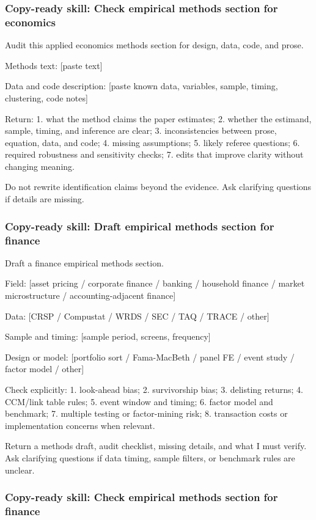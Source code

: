 \documentclass[11pt]{article}
\newcommand{\skill}[1]{\subsubsection*{Copy-ready skill: #1}}
\begin{document}
\skill{Check empirical methods section for economics}

\begin{promptblock}
Audit this applied economics methods section for design, data, code, and prose.

Methods text:
[paste text]

Data and code description:
[paste known data, variables, sample, timing, clustering, code notes]

Return:
1. what the method claims the paper estimates;
2. whether the estimand, sample, timing, and inference are clear;
3. inconsistencies between prose, equation, data, and code;
4. missing assumptions;
5. likely referee questions;
6. required robustness and sensitivity checks;
7. edits that improve clarity without changing meaning.

Do not rewrite identification claims beyond the evidence. Ask clarifying
questions if details are missing.
\end{promptblock}

\skill{Draft empirical methods section for finance}

\begin{promptblock}
Draft a finance empirical methods section.

Field:
[asset pricing / corporate finance / banking / household finance / market microstructure / accounting-adjacent finance]

Data:
[CRSP / Compustat / WRDS / SEC / TAQ / TRACE / other]

Sample and timing:
[sample period, screens, frequency]

Design or model:
[portfolio sort / Fama-MacBeth / panel FE / event study / factor model / other]

Check explicitly:
1. look-ahead bias;
2. survivorship bias;
3. delisting returns;
4. CCM/link table rules;
5. event window and timing;
6. factor model and benchmark;
7. multiple testing or factor-mining risk;
8. transaction costs or implementation concerns when relevant.

Return a methods draft, audit checklist, missing details, and what I must verify.
Ask clarifying questions if data timing, sample filters, or benchmark rules are unclear.
\end{promptblock}

\skill{Check empirical methods section for finance}
\end{document}
